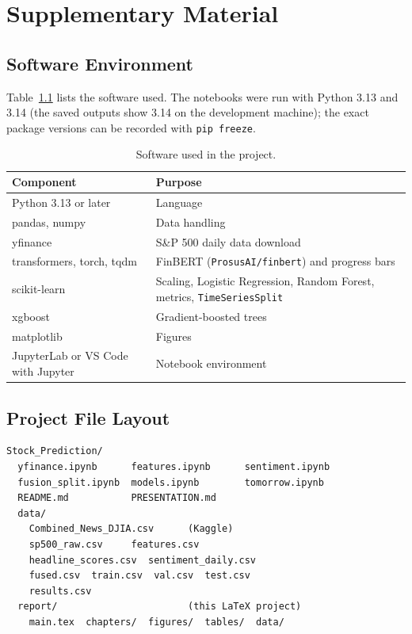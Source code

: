 \chapter{Supplementary Material}

\section{Software Environment}
Table~\ref{tab:env} lists the software used. The notebooks were run with Python 3.13 and 3.14 (the saved outputs show 3.14 on the development machine); the exact package versions can be recorded with \texttt{pip freeze}.

\begin{table}[!htbp]
\centering
\small
\begin{tabular}{@{}lp{7.5cm}@{}}
\toprule
Component & Purpose \\
\midrule
Python 3.13 or later & Language \\
pandas, numpy & Data handling \\
yfinance & S\&P 500 daily data download \\
transformers, torch, tqdm & FinBERT (\texttt{ProsusAI/finbert}) and progress bars \\
scikit-learn & Scaling, Logistic Regression, Random Forest, metrics, \texttt{TimeSeriesSplit} \\
xgboost & Gradient-boosted trees \\
matplotlib & Figures \\
JupyterLab or VS Code with Jupyter & Notebook environment \\
\bottomrule
\end{tabular}
\caption{Software used in the project.}
\label{tab:env}
\end{table}

\section{Project File Layout}
\begin{lstlisting}[float=!htbp, language={}, caption={Layout of the project directory.}]
Stock_Prediction/
  yfinance.ipynb      features.ipynb      sentiment.ipynb
  fusion_split.ipynb  models.ipynb        tomorrow.ipynb
  README.md           PRESENTATION.md
  data/
    Combined_News_DJIA.csv      (Kaggle)
    sp500_raw.csv     features.csv
    headline_scores.csv  sentiment_daily.csv
    fused.csv  train.csv  val.csv  test.csv
    results.csv
  report/                       (this LaTeX project)
    main.tex  chapters/  figures/  tables/  data/
\end{lstlisting}

